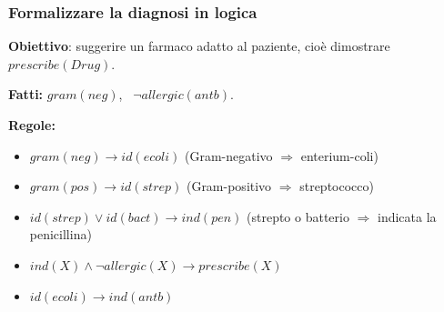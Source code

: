 
\subsubsection{Formalizzare la diagnosi in logica}

\textbf{Obiettivo}: suggerire un farmaco adatto al paziente, cioè dimostrare
$\mathit{prescribe}(\mathit{Drug})$.

\textbf{Fatti:} $\mathit{gram}(\mathit{neg})$, \
$\neg\mathit{allergic}(\mathit{antb})$.

\textbf{Regole:}
\begin{itemize}
  \item[R1:] $\mathit{gram}(\mathit{neg}) \to \mathit{id}(\mathit{ecoli})$
             \hfill (Gram-negativo $\Rightarrow$ enterium-coli)
  \item[R2:] $\mathit{gram}(\mathit{pos}) \to \mathit{id}(\mathit{strep})$
             \hfill (Gram-positivo $\Rightarrow$ streptococco)
  \item[R3:] $\mathit{id}(\mathit{strep}) \vee \mathit{id}(\mathit{bact}) \to \mathit{ind}(\mathit{pen})$
             \hfill (strepto o batterio $\Rightarrow$ indicata la penicillina)
  \item[R4:] $\mathit{ind}(X) \wedge \neg\mathit{allergic}(X) \to \mathit{prescribe}(X)$
  \item[R5:] $\mathit{id}(\mathit{ecoli}) \to \mathit{ind}(\mathit{antb})$
\end{itemize}

